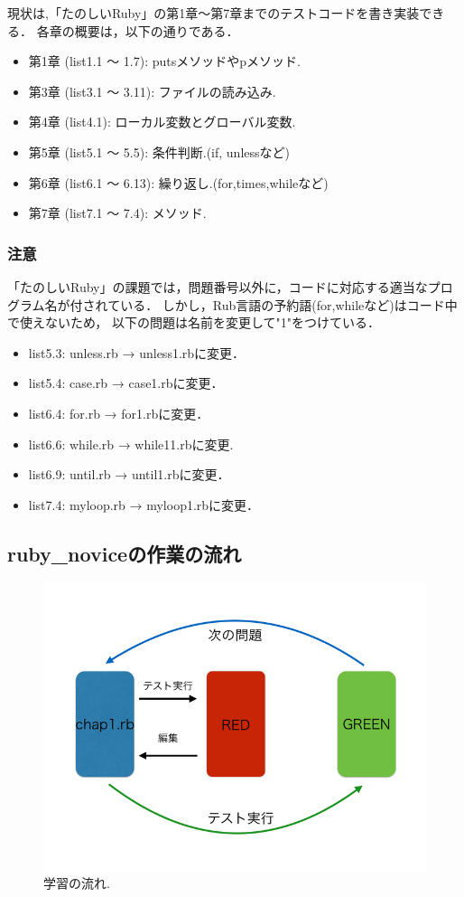 現状は,「たのしいRuby」の第1章〜第7章までのテストコードを書き実装できる．
各章の概要は，以下の通りである．

\begin{itemize}
\item 第1章 (list1.1 〜 1.7):  putsメソッドやpメソッド.
\item 第3章 (list3.1 〜 3.11): ファイルの読み込み.
\item 第4章 (list4.1):        ローカル変数とグローバル変数.
\item 第5章 (list5.1 〜 5.5):  条件判断.(if, unlessなど)
\item 第6章 (list6.1 〜 6.13): 繰り返し.(for,times,whileなど)
\item 第7章 (list7.1 〜 7.4):  メソッド.
\end{itemize}
\subsubsection{注意}

「たのしいRuby」の課題では，問題番号以外に，コードに対応する適当なプログラム名が付されている．
しかし，Rub言語の予約語(for,whileなど)はコード中で使えないため，
以下の問題は名前を変更して"1"をつけている．

\begin{itemize}
\item list5.3:  unless.rb → unless1.rbに変更．
\item list5.4:  case.rb → case1.rbに変更．
\item list6.4:  for.rb → for1.rbに変更．
\item list6.6:  while.rb → while11.rbに変更.
\item list6.9:  until.rb → until1.rbに変更．
\item list7.4:  myloop.rb → myloop1.rbに変更．
\end{itemize}
\subsection{ruby\_noviceの作業の流れ}
\begin{figure}[H]\begin{center}
\includegraphics[width=12cm,bb= 0 0 737 553]{../figs/./ruby_novice.003.jpg}
\caption{学習の流れ.}
\label{default}\end{center}\end{figure}

